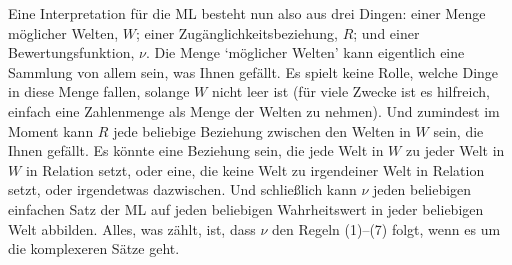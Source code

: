 Eine Interpretation für die ML besteht nun also aus drei Dingen: einer Menge möglicher Welten, $W$; einer Zugänglichkeitsbeziehung, $R$; und einer Bewertungsfunktion, $\nu$. Die Menge `möglicher Welten' kann eigentlich eine Sammlung von allem sein, was Ihnen gefällt. Es spielt keine Rolle, welche Dinge in diese Menge fallen, solange $W$ nicht leer ist (für viele Zwecke ist es hilfreich, einfach eine Zahlenmenge als Menge der Welten zu nehmen). Und zumindest im Moment kann $R$ jede beliebige Beziehung zwischen den Welten in $W$ sein, die Ihnen gefällt. Es könnte eine Beziehung sein, die jede Welt in $W$ zu jeder Welt in $W$ in Relation setzt, oder eine, die keine Welt zu irgendeiner Welt in Relation setzt, oder irgendetwas dazwischen. Und schlie{\ss}lich kann $\nu$ jeden beliebigen einfachen Satz der ML auf jeden beliebigen Wahrheitswert in jeder beliebigen Welt abbilden. Alles, was zählt, ist, dass $\nu$ den Regeln (1)--(7) folgt, wenn es um die komplexeren Sätze geht.

